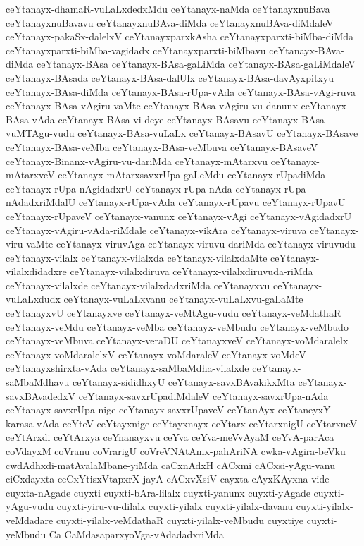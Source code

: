 {ceYtanayx-dhamaR-vuLaLxdedxMdu
ceYtanayx-naMda
ceYtanayxnuBava
ceYtanayxnuBavavu
ceYtanayxnuBAva-diMda
ceYtanayxnuBAva-diMdaleV
ceYtanayx-pakaSx-dalelxV
ceYtanayxparxkAsha
ceYtanayxparxti-biMba-diMda
ceYtanayxparxti-biMba-vagidadx
ceYtanayxparxti-biMbavu
ceYtanayx-BAva-diMda
ceYtanayx-BAsa
ceYtanayx-BAsa-gaLiMda
ceYtanayx-BAsa-gaLiMdaleV
ceYtanayx-BAsada
ceYtanayx-BAsa-dalUlx
ceYtanayx-BAsa-davAyxpitxyu
ceYtanayx-BAsa-diMda
ceYtanayx-BAsa-rUpa-vAda
ceYtanayx-BAsa-vAgi-ruva
ceYtanayx-BAsa-vAgiru-vaMte
ceYtanayx-BAsa-vAgiru-vu-danunx
ceYtanayx-BAsa-vAda
ceYtanayx-BAsa-vi-deye
ceYtanayx-BAsavu
ceYtanayx-BAsa-vuMTAgu-vudu
ceYtanayx-BAsa-vuLaLx
ceYtanayx-BAsavU
ceYtanayx-BAsave
ceYtanayx-BAsa-veMba
ceYtanayx-BAsa-veMbuva
ceYtanayx-BAsaveV
ceYtanayx-Binanx-vAgiru-vu-dariMda
ceYtanayx-mAtarxvu
ceYtanayx-mAtarxveV
ceYtanayx-mAtarxsavxrUpa-gaLeMdu
ceYtanayx-rUpadiMda
ceYtanayx-rUpa-nAgidadxrU
ceYtanayx-rUpa-nAda
ceYtanayx-rUpa-nAdadxriMdalU
ceYtanayx-rUpa-vAda
ceYtanayx-rUpavu
ceYtanayx-rUpavU
ceYtanayx-rUpaveV
ceYtanayx-vanunx
ceYtanayx-vAgi
ceYtanayx-vAgidadxrU
ceYtanayx-vAgiru-vAda-riMdale
ceYtanayx-vikAra
ceYtanayx-viruva
ceYtanayx-viru-vaMte
ceYtanayx-viruvAga
ceYtanayx-viruvu-dariMda
ceYtanayx-viruvudu
ceYtanayx-vilalx
ceYtanayx-vilalxda
ceYtanayx-vilalxdaMte
ceYtanayx-vilalxdidadxre
ceYtanayx-vilalxdiruva
ceYtanayx-vilalxdiruvuda-riMda
ceYtanayx-vilalxde
ceYtanayx-vilalxdadxriMda
ceYtanayxvu
ceYtanayx-vuLaLxdudx
ceYtanayx-vuLaLxvanu
ceYtanayx-vuLaLxvu-gaLaMte
ceYtanayxvU
ceYtanayxve
ceYtanayx-veMtAgu-vudu
ceYtanayx-veMdathaR
ceYtanayx-veMdu
ceYtanayx-veMba
ceYtanayx-veMbudu
ceYtanayx-veMbudo
ceYtanayx-veMbuva
ceYtanayx-veraDU
ceYtanayxveV
ceYtanayx-voMdaralelx
ceYtanayx-voMdaralelxV
ceYtanayx-voMdaraleV
ceYtanayx-voMdeV
ceYtanayxshirxta-vAda
ceYtanayx-saMbaMdha-vilalxde
ceYtanayx-saMbaMdhavu
ceYtanayx-sididhxyU
ceYtanayx-savxBAvakikxMta
ceYtanayx-savxBAvadedxV
ceYtanayx-savxrUpadiMdaleV
ceYtanayx-savxrUpa-nAda
ceYtanayx-savxrUpa-nige
ceYtanayx-savxrUpaveV
ceYtanAyx
ceYtaneyxY-karasa-vAda
ceYteV
ceYtayxnige
ceYtayxnayx
ceYtarx
ceYtarxnigU
ceYtarxneV
ceYtArxdi
ceYtArxya
ceYnanayxvu
ceYva
ceYva-meVvAyaM
ceYvA-parAca
coVdayxM
coVranu
coVrarigU
coVreVNAtAmx-pahAriNA
cwka-vAgira-beVku
cwdAdhxdi-matAvalaMbane-yiMda
caCxnAdxH
cACxmi
cACxsi-yAgu-vanu
ciCxdayxta
ceCxYtisxVtapxrX-jayA
cACxvXsiV
cayxta
cAyxKAyxna-vide
cuyxta-nAgade
cuyxti
cuyxti-bAra-lilalx
cuyxti-yanunx
cuyxti-yAgade
cuyxti-yAgu-vudu
cuyxti-yiru-vu-dilalx
cuyxti-yilalx
cuyxti-yilalx-davanu
cuyxti-yilalx-veMdadare
cuyxti-yilalx-veMdathaR
cuyxti-yilalx-veMbudu
cuyxtiye
cuyxti-yeMbudu
Ca
CaMdasaparxyoVga-vAdadadxriMda
}
